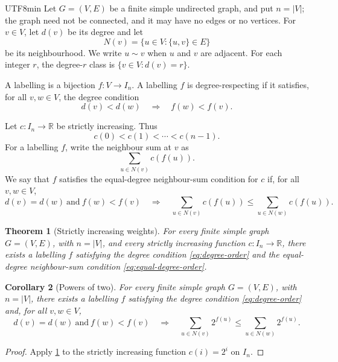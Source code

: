\documentclass[reqno]{amsart}
\newtheorem{theorem}{Theorem}
\newtheorem{corollary}[theorem]{Corollary}
\theoremstyle{definition}
\newcommand{\R}{\mathbb{R}}
\numberwithin{equation}{section}
\begin{document}
\begin{CJK*}{UTF8}{min}
Let \(G=(V,E)\) be a finite simple undirected graph, and put \(n=|V|\); the
graph need not be connected, and it may have no edges or no vertices. For
\(v\in V\), let \(d(v)\) be its degree and let
\[
  N(v)=\{u\in V:\{u,v\}\in E\}
\]
be its neighbourhood. We write \(u\sim v\) when \(u\) and \(v\) are adjacent.
For each integer \(r\), the degree-\(r\) class is
\(\{v\in V:d(v)=r\}\).

A labelling is a bijection \(f:V\longrightarrow I_n\). A labelling \(f\) is
degree-respecting if it satisfies, for all \(v,w\in V\), the degree condition
\begin{equation}
  d(v)<d(w)\quad\Longrightarrow\quad f(w)<f(v).
\label{eq:degree-order}
\end{equation}

Let \(c:I_n\to\R\) be strictly increasing. Thus
\begin{equation}
  c(0)<c(1)<\cdots<c(n-1).
  \label{eq:strict-weights}
\end{equation}
For a labelling \(f\), write the neighbour sum at \(v\) as
\[
  \sum_{u\in N(v)}c(f(u)).
\]
We say that \(f\) satisfies the equal-degree neighbour-sum condition for \(c\) if, for all
\(v,w\in V\),
\begin{equation}
  d(v)=d(w)\ \text{and}\ f(w)<f(v)
  \quad\Longrightarrow\quad
  \sum_{u\in N(v)}c(f(u))\leq\sum_{u\in N(w)}c(f(u)).
  \label{eq:equal-degree-order}
\end{equation}

\begin{theorem}[Strictly increasing weights]\label{thm:strict-weights}
For every finite simple graph \(G=(V,E)\), with \(n=|V|\), and every strictly
increasing function \(c:I_n\to\R\), there exists a labelling \(f\) satisfying
the degree condition \eqref{eq:degree-order} and the equal-degree neighbour-sum
condition \eqref{eq:equal-degree-order}.
\end{theorem}

\begin{corollary}[Powers of two]\label{cor:powers-of-two}
For every finite simple graph \(G=(V,E)\), with \(n=|V|\), there exists a
labelling \(f\) satisfying the degree condition \eqref{eq:degree-order} and, for
all \(v,w\in V\),
\[
  d(v)=d(w)\ \text{and}\ f(w)<f(v)
  \quad\Longrightarrow\quad
  \sum_{u\in N(v)}2^{f(u)}
  \leq
  \sum_{u\in N(w)}2^{f(u)}.
\]
\end{corollary}

\begin{proof}
Apply \cref{thm:strict-weights} to the strictly increasing function
\(c(i)=2^i\) on \(I_n\).
\end{proof}


\end{CJK*}
\end{document}
